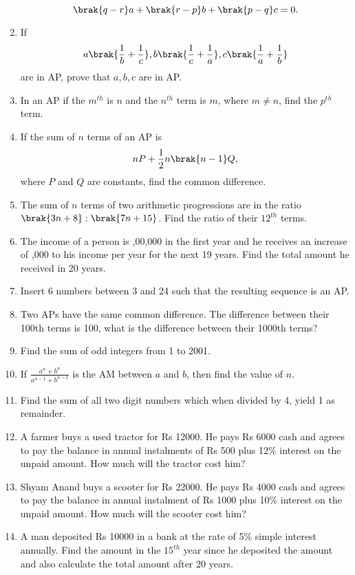 \begin{enumerate}[label=\thesubsection.\arabic*, ref=\thesubsection.\theenumi]
$$\brak{q - r }a + \brak{r - p }b + \brak{p - q }c = 0.$$
\item If $$a\brak{\frac{1}{b}+\frac{1}{c}}, b\brak{\frac{1}{c}+\frac{1}{a}}, c\brak{\frac{1}{a}+\frac{1}{b}}$$ are in AP, prove that $a, b, c$ are in AP. 
\item In an AP if the $m^{th}$ is $n$ and the $n^{th}$ term is $m$, where $m \ne n$, find the $p^{th}$ term.
\item If the sum of $n$ terms of an AP is
	$$nP+\frac{1}{2} n\brak{n-1}Q,$$
	where $P$ and $Q$ are constants, find the common difference.
\item The sum of $n$ terms of two arithmetic progressions are in the ratio
	$\brak{3n+8}:\brak{7n+15}$.  Find the ratio of their $12^{th}$ terms.
\item The income of a person is ,00,000 in the first year and he receives an increase of ,000 to his income per year for the next 19 years.  Find the total amount he received in 20 years.
\item Insert 6 numbers between 3 and 24 such that the resulting sequence is an AP.
\item Two APs have the same common difference. The difference between their 100th terms is 100,  what is the difference between their 1000th terms?
\item Find the sum of odd integers from 1 to 2001.
\item If $\frac{a^n+b^n}{a^{n-1}+b^{n-1}}$ is the AM  between $a$ and $b$,  then find the value of $n$.
\item Find the sum of all two digit numbers which when divided by 4,  yield 1 as remainder.
\item A farmer buys a used tractor for Rs 12000. He pays Rs 6000 cash and agrees to pay the balance in annual instalments of Rs 500 plus 12\% interest on the unpaid amount. How much will the tractor cost him?
\item Shyam Anand buys a scooter for Rs 22000. He pays Rs 4000 cash and agrees to
pay the balance in annual instalment of Rs 1000 plus 10\% interest on the unpaid
amount. How much will the scooter cost him?
\item A man deposited Rs 10000 in a bank at the rate of 5\% simple interest annually. Find the amount in the $15^{th}$ year since he deposited the amount and also calculate the total amount after 20 years.

\end{enumerate}
